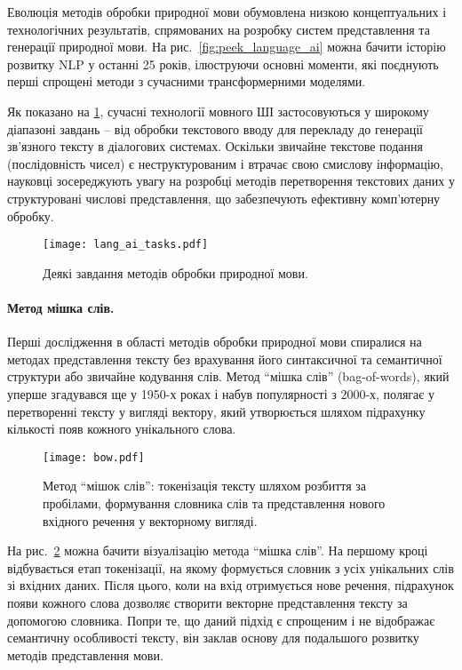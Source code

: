 Еволюція методів обробки природної мови обумовлена низкою концептуальних і технологічних результатів, спрямованих на розробку систем представлення та генерації природної мови. На рис.~\ref{fig:peek_language_ai} можна бачити історію розвитку NLP у останні 25 років, ілюструючи основні моменти, які поєднують перші спрощені методи з сучасними трансформерними моделями.

Як показано на \ref{fig:lang-ai-tasks}, сучасні технології мовного ШІ застосовуються у широкому діапазоні завдань – від обробки текстового вводу для перекладу до генерації зв’язного тексту в діалогових системах. Оскільки звичайне текстове подання (послідовність чисел) є неструктурованим і втрачає свою смислову інформацію, науковці зосереджують увагу на розробці методів перетворення текстових даних у структуровані числові представлення, що забезпечують ефективну комп'ютерну обробку.

\begin{figure}[!h]
    \centering
    \texttt{[image: lang\_ai\_tasks.pdf]}
    \caption{Деякі завдання методів обробки природної мови.}
    \label{fig:lang-ai-tasks}
\end{figure}

\paragraph{Метод мішка слів.}

Перші дослідження в області методів обробки природної мови спиралися на методах представлення тексту без врахування його синтаксичної та семантичної структури або звичайне кодування слів. Метод ``мішка слів'' (bag-of-words), який уперше згадувався ще у 1950-х роках і набув популярності з 2000-х, полягає у перетворенні тексту у вигляді вектору, який утворюється шляхом підрахунку кількості появ кожного унікального слова.

\begin{figure}[!h]
    \centering
    \texttt{[image: bow.pdf]}
    \caption{Метод ``мішок слів'': токенізація тексту шляхом розбиття за пробілами, формування словника слів та представлення нового вхідного речення у векторному вигляді.}
    \label{fig:bow}
\end{figure}

На рис.~\ref{fig:bow} можна бачити візуалізацію метода ``мішка слів''. На першому кроці відбувається етап токенізації, на якому формується словник з усіх унікальних слів зі вхідних даних. Після цього, коли на вхід отримується нове речення, підрахунок появи кожного слова дозволяє створити векторне представлення тексту за допомогою словника. Попри те, що даний підхід є спрощеним і не відображає семантичну особливості тексту, він заклав основу для подальшого розвитку методів представлення мови.


